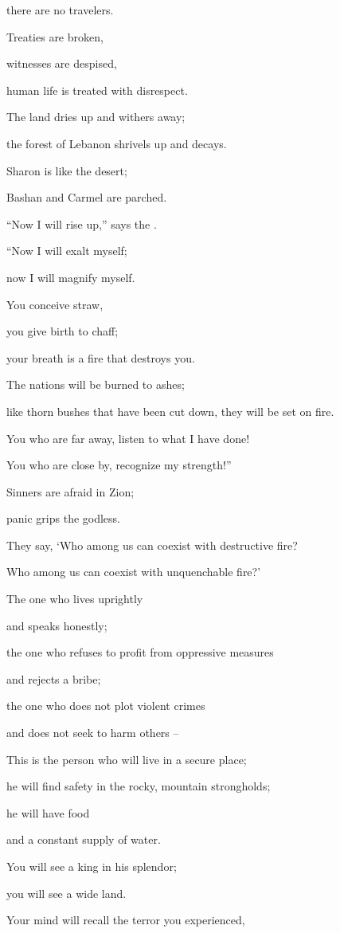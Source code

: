 {\par }{\Q there are no travelers.
\par }{\Q Treaties
are broken,
\par }{\Q witnesses are despised,
\par }{\Q human life is treated with disrespect.
\par }{\Q {}The land
dries up
and withers away;
\par }{\Q the forest of Lebanon
shrivels up
and decays.
\par }{\Q Sharon
is like
the desert;
\par }{\Q Bashan
and Carmel
are parched.
\par }{\Q {}“Now
I will rise
up,” says
the {}.
\par }{\Q “Now
I will exalt
myself;
\par }{\Q now
I will magnify myself.
\par }{\Q {}You conceive
straw,
\par }{\Q you give birth
to chaff;
\par }{\Q your breath
is a fire
that destroys you.
\par }{\Q {}The nations
will be
burned
to ashes;
\par }{\Q like thorn bushes
that have been cut down,
they will be set
on fire.
\par }{\Q {}You who are far
away, listen
to what
I have
done!
\par }{\Q You
who are close
by, recognize
my strength!”
\par }{\Q {}Sinners
are afraid
in Zion;
\par }{\Q panic
grips
the godless.
\par }{\Q They say, ‘Who
among us can coexist
with destructive
fire?
\par }{\Q Who
among us can coexist
with unquenchable
fire?’
\par }{\Q {}The one who lives
uprightly
\par }{\Q and speaks
honestly;
\par }{\Q the one who refuses
to profit
from oppressive
measures
\par }{\Q and rejects
a bribe;
\par }{\Q the one who does not
plot
violent crimes
\par }{\Q and does not
seek
to harm others –
\par }{\Q {}This is the person who will live
in a secure place;
\par }{\Q he will find safety
in the rocky,
mountain strongholds;
\par }{\Q he will have
food
\par }{\Q and a constant
supply of water.
\par }{\Q {}You will see
a king
in his splendor;
\par }{\Q you will see
a wide
land.
\par }{\Q {}Your mind
will recall
the terror
you experienced,

}
